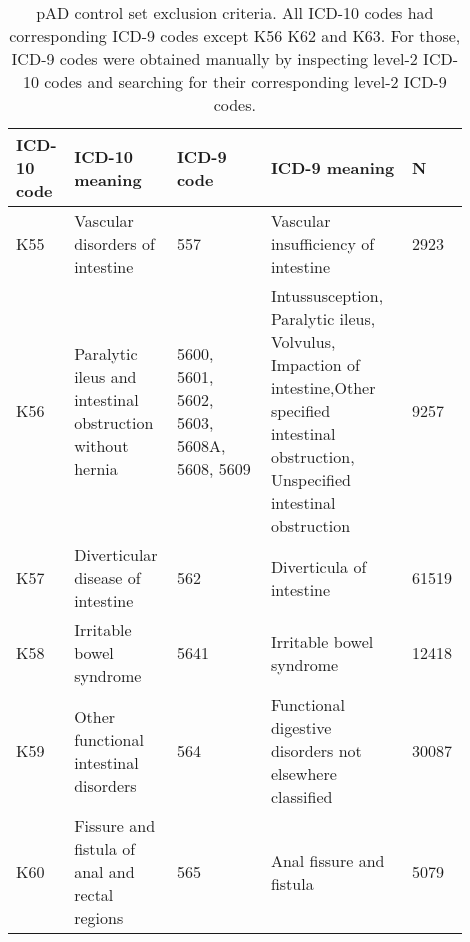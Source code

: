 \begin{table}[]
  \caption{pAD control set exclusion criteria. All ICD-10 codes had corresponding ICD-9 codes except K56 K62 and K63. For those, ICD-9 codes were obtained manually by inspecting level-2 ICD-10 codes and searching for their corresponding level-2 ICD-9 codes.}
  \label{table:ukbb_ctrl_excl_criteria}
  \begin{tabular}{|p{0.1\linewidth}|p{0.2\linewidth}|p{0.2\linewidth}|p{0.3\linewidth}|p{0.1\linewidth}|}
  \hline
  ICD-10 code & ICD-10 meaning                                            & ICD-9 code                          & ICD-9 meaning     & N                                                                                                                                                          \\ \hline
  K55         & Vascular disorders of intestine                           & 557                                 & Vascular insufficiency of intestine       & 2923                                                                                                                                  \\ \hline
  K56         & Paralytic ileus and intestinal obstruction without hernia & 5600, 5601, 5602, 5603, 5608A, 5608, 5609 & Intussusception, Paralytic ileus, Volvulus, Impaction of intestine,Other specified intestinal obstruction, Unspecified intestinal obstruction & 9257                              \\ \hline
  K57         & Diverticular disease of intestine                         & 562                                 & Diverticula of intestine              &     61519                                                                                                                                  \\ \hline
  K58         & Irritable bowel syndrome                                  & 5641                                & Irritable bowel syndrome          & 12418                                                                                                                                          \\ \hline
  K59         & Other functional intestinal disorders                     & 564                                 & Functional digestive disorders not elsewhere classified      & 30087                                                                                                               \\ \hline
  K60         & Fissure and fistula of anal and rectal regions            & 565                                 & Anal fissure and fistula     & 5079                                                                                                                                               \\ \hline

\end{tabular}
\end{table}

